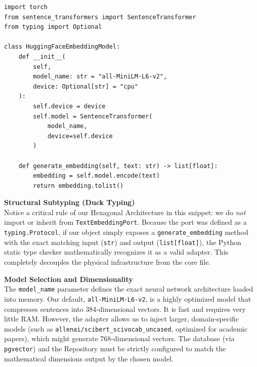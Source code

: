 \begin{lstlisting}[caption={The Machine Learning Adapter}]
import torch
from sentence_transformers import SentenceTransformer
from typing import Optional

class HuggingFaceEmbeddingModel:
    def __init__(
        self,
        model_name: str = "all-MiniLM-L6-v2",
        device: Optional[str] = "cpu"
    ):
        self.device = device
        self.model = SentenceTransformer(
            model_name,
            device=self.device
        )

    def generate_embedding(self, text: str) -> list[float]:
        embedding = self.model.encode(text)
        return embedding.tolist()
\end{lstlisting}

\textbf{Structural Subtyping (Duck Typing)} \\
Notice a critical rule of our Hexagonal Architecture in this snippet: we do \textit{not} import or inherit from \texttt{TextEmbeddingPort}. Because the port was defined as a \texttt{typing.Protocol}, if our object simply exposes a \texttt{generate\_embedding} method with the exact matching input (\texttt{str}) and output (\texttt{list[float]}), the Python static type checker mathematically recognizes it as a valid adapter. This completely decouples the physical infrastructure from the core file.

\textbf{Model Selection and Dimensionality} \\
The \texttt{model\_name} parameter defines the exact neural network architecture loaded into memory. Our default, \texttt{all-MiniLM-L6-v2}, is a highly optimized model that compresses sentences into 384-dimensional vectors. It is fast and requires very little RAM. However, the adapter allows us to inject larger, domain-specific models (such as \texttt{allenai/scibert\_scivocab\_uncased}, optimized for academic papers), which might generate 768-dimensional vectors. The database (via \texttt{pgvector}) and the Repository must be strictly configured to match the mathematical dimensions output by the chosen model.

